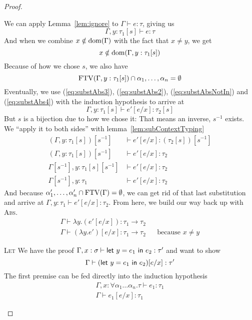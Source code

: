 \begin{proof}
\begin{description}
    We can apply Lemma~\ref{lem:ignore} to $\Gamma \vdash e : \tau$, giving us
    \begin{equation}
      \Gamma , y : \tau_1[s] \vdash e : \tau\label{eq:substAbs3}
    \end{equation}
    And when we combine $x \notin \operatorname{dom}(\Gamma)$ with the fact that $x \ne y$, we get
    \begin{equation}
      x \notin \operatorname{dom}(\Gamma , y : \tau_1[s])
      \label{eq:substAbsNotIn}
    \end{equation}
    Because of how we chose $s$, we also have
    \begin{equation}
      \operatorname{FTV}(\Gamma, y : \tau_1[s]) \cap {\alpha_1,\ldots,\alpha_n} = \emptyset\label{eq:substAbs4}
    \end{equation}
    Eventually, we use (\ref{eq:substAbs3}), (\ref{eq:substAbs2}),
    (\ref{eq:substAbsNotIn}) and (\ref{eq:substAbs4}) with the
    induction hypothesis to arrive at
    \[ \Gamma , y : \tau_1[s] \vdash e' [e/x] : \tau_2[s] \]
    But $s$ is a bijection due to how we chose it: That means an
    inverse, $s^{-1}$ exists. We ``apply it to both sides'' with
    lemma~\ref{lem:subContextTyping}
    \begin{align*}
      (\Gamma , y : \tau_1[s])[s^{-1}] &\vdash e' [e/x] : (\tau_2[s])[s^{-1}] \\
      (\Gamma , y : \tau_1[s])[s^{-1}] &\vdash e' [e/x] : \tau_2 \\
      \Gamma[s^{-1}] , y : \tau_1[s][s^{-1}] &\vdash e' [e/x] : \tau_2 \\
      \Gamma[s^{-1}], y : \tau_1 &\vdash e' [e/x] : \tau_2
    \end{align*}
    And because $\alpha'_1 , \ldots, \alpha'_n \cap \operatorname{FTV}(\Gamma) = \emptyset$, we can get rid of that
    last substitution and arrive at ${\Gamma, y : \tau_1 \vdash e' [e/x] : \tau_2}$.
    From here, we build our way back up with \textsc{Abs}.
    \begin{align*}
      \Gamma \vdash \lambda y . (e' [e/x]) : \tau_1 \rightarrow \tau_2 \\
      \Gamma \vdash (\lambda y . e')[e/x] : \tau_1 \rightarrow \tau_2 && \text{because } x \ne y
    \end{align*}
    
  \item{\rm\textsc{Let}} We have the proof ${\Gamma , x : \sigma \vdash \mathsf{let} \ y = e_1 \ \mathsf{in} \ e_2 :
      \tau'}$
    and want to show
    \[\Gamma \vdash (\mathsf{let} \ y = e_1 \ \mathsf{in} \ e_2)[e/x] : \tau'\]
    The first premise can be fed directly into the induction hypothesis
    \begin{align}
      \Gamma , x : \forall \alpha_1\ldots\alpha_n . \tau \vdash e_1 : \tau_1 \nonumber \\
      \Gamma \vdash e_1 [e / x] : \tau_1 \label{eq:substLet7}
    \end{align}


\end{description}
\end{proof}
